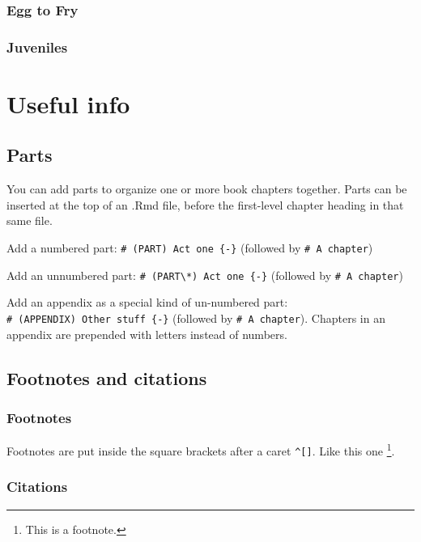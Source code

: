 \documentclass[
]{book}
\theoremstyle{definition}
\theoremstyle{definition}
\theoremstyle{definition}
\theoremstyle{definition}
\theoremstyle{remark}
\begin{document}
\hypertarget{egg-to-fry}{%
\subsection{Egg to Fry}\label{egg-to-fry}}

\hypertarget{juveniles}{%
\subsection{Juveniles}\label{juveniles}}

\hypertarget{useful-info}{%
\chapter{Useful info}\label{useful-info}}

\hypertarget{parts}{%
\section{Parts}\label{parts}}

You can add parts to organize one or more book chapters together. Parts can be inserted at the top of an .Rmd file, before the first-level chapter heading in that same file.

Add a numbered part: \texttt{\#\ (PART)\ Act\ one\ \{-\}} (followed by \texttt{\#\ A\ chapter})

Add an unnumbered part: \texttt{\#\ (PART\textbackslash{}*)\ Act\ one\ \{-\}} (followed by \texttt{\#\ A\ chapter})

Add an appendix as a special kind of un-numbered part: \texttt{\#\ (APPENDIX)\ Other\ stuff\ \{-\}} (followed by \texttt{\#\ A\ chapter}). Chapters in an appendix are prepended with letters instead of numbers.

\hypertarget{footnotes-and-citations}{%
\section{Footnotes and citations}\label{footnotes-and-citations}}

\hypertarget{footnotes}{%
\subsection{Footnotes}\label{footnotes}}

Footnotes are put inside the square brackets after a caret \texttt{\^{}{[}{]}}. Like this one \footnote{This is a footnote.}.

\hypertarget{citations}{%
\subsection{Citations}\label{citations}}
\end{document}

